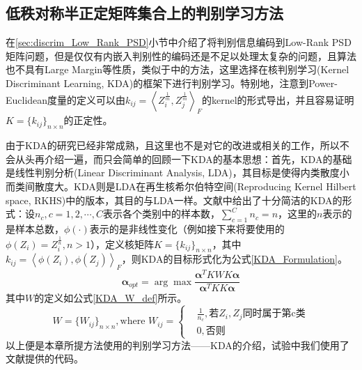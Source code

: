 \subsection{低秩对称半正定矩阵集合上的判别学习方法}
在\ref{sec:discrim_Low_Rank_PSD}小节中介绍了将判别信息编码到Low-Rank PSD矩阵问题，但是仅仅有内嵌入判别性的编码还是不足以处理太复杂的问题，且算法也不具有Large Margin等性质，类似于\cite{PSD_WACV}中的方法，这里选择在核判别学习(Kernel Discriminant Learning, KDA\cite{Kernel_KDA})的框架下进行判别学习。特别地，注意到Power-Euclidean度量的定义可以由$k_{ij}=\left<Z_{i}^{\frac{1}{m}},Z_{j}^{\frac{1}{m}}\right>_{F}$的kernel的形式导出，并且容易证明$K=\{k_{ij}\}_{n\times  n}$的正定性。

由于KDA\cite{Kernel_KDA}的研究已经非常成熟，且这里也不是对它的改进或相关的工作，所以不会从头再介绍一遍，而只会简单的回顾一下KDA的基本思想：首先，KDA的基础是线性判别分析(Linear Discriminant Analysis, LDA)，其目标是使得内类散度小而类间散度大。KDA则是LDA在再生核希尔伯特空间(Reproducing Kernel Hilbert space, RKHS)中的版本，其目的与LDA一样。文献\cite{Kernel_KDA}中给出了十分简洁的KDA的形式：设$n_c,c=1,2,\cdots,C$表示各个类别中的样本数，$\sum_{c=1}^{C}n_{c}=n$，这里的$n$表示的是样本总数，$\phi(\cdot)$表示的是非线性变化（例如接下来将要使用的$\phi(Z_{i})=Z_{i}^{\frac{1}{n}},n>1$），定义核矩阵$K=\{k_{ij}\}_{n\times n}$，其中$k_{ij}=\left<\phi(Z_{i}),\phi(Z_j)\right>_{F}$，则KDA的目标形式化为公式\ref{KDA_Formulation}。
\begin{equation}
\label{KDA_Formulation}
\bm{\alpha}_{opt}=\arg \max\frac{\bm{\alpha}^{T}KWK\bm{\alpha}}{\bm{\alpha}^{T}KK\bm{\alpha}}
\end{equation}
其中$W$的定义如公式\ref{KDA_W_def}所示。
\begin{equation}
\label{KDA_W_def}
W=\{W_{ij}\}_{n \times n},\text{where }W_{ij}=\left\{
\begin{split}
&\frac{1}{n_{c}},\text{若$Z_{i},Z_{j}$同时属于第c类}\\
&0, \text{否则}
\end{split}
\right.
\end{equation}
以上便是本章所提方法使用的判别学习方法——KDA\cite{Kernel_KDA}的介绍，试验中我们使用了文献\cite{KDA_DengCai1,KDA_DengCai2}提供的代码。
